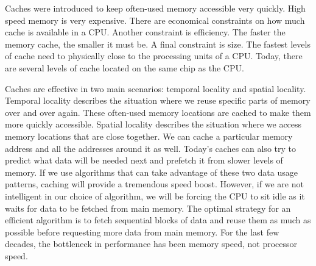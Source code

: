 Caches were introduced to keep often-used memory accessible very quickly.  High speed memory is very expensive.
There are economical constraints on how much cache is available in a CPU.
Another constraint is efficiency.  The faster the memory cache, the smaller it must be.
A final constraint is size.  The fastest levels of cache need to physically close to the processing units of a CPU.
Today, there are several levels of cache located on the same chip as the CPU.

Caches are effective in two main scenarios: temporal locality and spatial locality.
Temporal locality describes the situation where we reuse specific parts of memory over and over again.
These often-used memory locations are cached to make them more quickly accessible.
Spatial locality describes the situation where we access memory locations that are close together.
We can cache a particular memory address and all the addresses around it as well.
Today's caches can also try to predict what data will be needed next and prefetch it from slower levels of memory.
If we use algorithms that can take advantage of these two data usage patterns, caching will provide a tremendous speed boost.
However, if we are not intelligent in our choice of algorithm, we will be forcing the CPU to sit idle as it waits for data to be fetched from main memory.
The optimal strategy for an efficient algorithm is to fetch sequential blocks of data and reuse them as much as possible before requesting more data from main memory.
For the last few decades, the bottleneck in performance has been memory speed, not processor speed.

